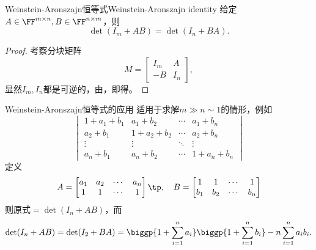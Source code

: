 \begin{theorem}
	{Weinstein-Aronszajn恒等式}{Weinstein-Aronszajn identity}
	给定$A\in\FF^{m\times n},B\in\FF^{n\times m}$，则 
	\begin{equation}
		\label{eqn:det(I+AB)=det(I+BA)}
		\det(I_m+AB)=\det(I_n+BA).
	\end{equation}
\end{theorem}
\begin{proof}
	考察分块矩阵
	\[
		M=\begin{bmatrix}
			I_m&A\\-B&I_n
		\end{bmatrix},
	\]
	显然$I_m,I_n$都是可逆的，由，即得。
\end{proof}

\begin{example}
	{Weinstein-Aronszajn恒等式的应用}{}
	 适用于求解$m\gg n\sim 1$的情形，例如
	\[
		\begin{vmatrix}
			1+a_1+b_1&a_1+b_2&\cdots&a_1+b_n\\
			a_2+b_1&1+a_2+b_2&\cdots&a_2+b_n\\
			\vdots&\vdots&\ddots&\vdots\\
			a_n+b_1&a_n+b_2&\cdots&1+a_n+b_n
		\end{vmatrix}
	\]
	定义 
	\[
		A=\begin{bmatrix}
			a_1&a_2&\cdots&a_n\\
			1&1&\cdots&1
		\end{bmatrix}\tp,\quad
		B=\begin{bmatrix}
			1&1&\cdots&1\\
			b_1&b_2&\cdots&b_n
		\end{bmatrix}
	\]
	则原式$=\det(I_n+AB)$，而
	\[
		\det(I_n+AB)=\det(I_2+BA)=\biggp{1+\sum_{i=1}^na_i}\biggp{1+\sum_{i=1}^nb_i}-n\sum_{i=1}^na_ib_i.
	\]
\end{example}

